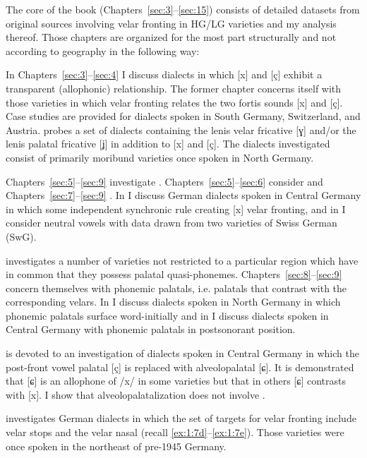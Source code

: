 The core of the book (Chapters~\ref{sec:3}--\ref{sec:15}) consists of detailed datasets from original sources involving velar fronting in HG/LG varieties and my analysis thereof. Those chapters are organized for the most part structurally and not according to geography in the following way: 

In Chapters~\ref{sec:3}--\ref{sec:4} I discuss dialects in which [x] and [ç] exhibit a transparent (allophonic) relationship. The former chapter concerns itself with those varieties in which velar fronting relates the two fortis sounds [x] and [ç]. Case studies are provided for dialects spoken in South Germany, Switzerland, and Austria.  probes a set of dialects containing the lenis velar fricative [ɣ] and/or the lenis palatal fricative [ʝ] in addition to [x] and [ç]. The dialects investigated consist of primarily moribund varieties once spoken in North Germany.  

Chapters~\ref{sec:5}--\ref{sec:9} investigate . Chapters~\ref{sec:5}--\ref{sec:6} consider  and Chapters~\ref{sec:7}--\ref{sec:9} . In  I discuss German dialects spoken in Central Germany in which some independent synchronic rule creating [x]  velar fronting, and in  I consider neutral vowels with data drawn from two varieties of Swiss German (SwG).

 investigates a number of varieties not restricted to a particular region which have in common that they possess palatal quasi-phonemes. Chapters~\ref{sec:8}--\ref{sec:9} concern themselves with phonemic palatals, i.e. palatals that contrast with the corresponding velars. In  I discuss dialects spoken in North Germany in which phonemic palatals surface word-initially and in  I discuss dialects spoken in Central Germany with phonemic palatals in postsonorant position. 

 is devoted to an investigation of dialects spoken in Central Germany in which the post-front vowel palatal [ç] is replaced with alveolopalatal [ɕ]. It is demonstrated that [ɕ] is an allophone of /x/ in some varieties but that in others [ɕ] contrasts with [x]. I show that alveolopalatalization does not involve .

 investigates German dialects in which the set of targets for velar fronting include velar stops and the velar nasal (recall \ref{ex:1:7d}--\ref{ex:1:7e}). Those varieties were once spoken in the northeast of pre-1945 Germany. 

